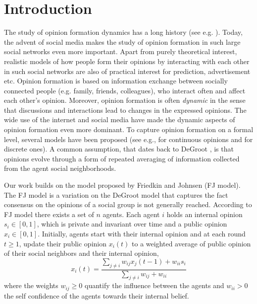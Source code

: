 \section{Introduction}

The study of opinion formation dynamics has a long history (see e.g.
\cite{Jackson}).  Today, the advent of social media makes the study of opinion
formation in such large social networks even more important.  Apart from purely
theoretical interest, realistic models of how people form their opinions by
interacting with each other in such social networks are also of practical
interest for prediction, advertisement etc.  Opinion formation is based on
information exchange between socially connected people (e.g. family, friends,
colleagues), who interact often and affect each other's opinion.  Moreover,
opinion formation is often \emph{dynamic} in the sense that discussions and
interactions lead to changes in the expressed opinions. The wide use of the
internet and social media have made the dynamic aspects of opinion formation
even more dominant.  To capture opinion formation on a formal level, several
models have been proposed (see e.g., \cite{DeGroot,FJ90,HK,BKO11} for
continuous opinions and \cite{FGV12,YOASS13,BFM16} for discrete ones).  A
common assumption, that dates back to DeGroot \cite{DeGroot}, is that opinions
evolve through a form of repeated averaging of information collected from the
agent social neighborhoods.

Our work builds on the model proposed by Friedkin and Johnsen \cite{FJ90}(FJ
model).  The FJ model is a variation on the DeGroot model that captures the
fact consensus on the opinions of a social group is not generally reached.
According to FJ model there exists a set of $n$ agents.  Each agent $i$ holds
an internal opinion $s_i\in [0,1]$, which is private and invariant over time
and a public opinion $x_i \in [0,1]$.  Initially, agents start with their
internal opinion and at each round $t\geq1$, update their public opinion
$x_i(t)$ to a weighted average of public opinion of their social neighbors and
their internal opinion,
%
\begin{equation}\label{eq:FJ_model}
  x_i(t)= \frac{\sum_{j\neq i}w_{ij}x_j(t-1) + w_{ii}s_i}{\sum_{j\neq
      i}w_{ij}+w_{ii}}
\end{equation}
%
where the weights $w_{ij}\geq 0$ quantify the influence between the agents and
$w_{ii}>0$ the self confidence of the agents towards their internal belief.


